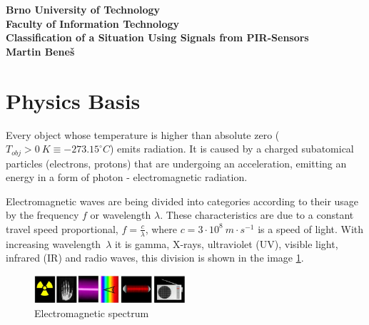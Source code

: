 \documentclass[10pt,a4paper]{article}
\begin{document}

  \begin{titlepage}

  \begin{center}
  \textsf{\LARGE \bfseries Brno University of Technology}\\[0.5cm]
  \textsf{\large \bfseries Faculty of Information Technology}\\[9cm]
  
  \textsf{ \Large \bfseries Classification of a Situation Using Signals from PIR-Sensors}\\[0.3cm]
  \textsf{ \bfseries Martin Beneš}\\[1cm]
  \end{center}
  \end{titlepage}
  \newpage

  \tableofcontents
  \newpage

  \section{Physics Basis}
  Every object whose temperature is higher than absolute zero ($T_{obj}>0~K\equiv -273.15^{\circ}C$)
  emits radiation. It is caused by a charged subatomical particles (electrons, protons) that are
  undergoing an acceleration, emitting an energy in a form of photon - electromagnetic radiation.
  
  Electromagnetic waves are being divided into categories according to their usage by the frequency $f$
  or wavelength $\lambda$. These characteristics are due to a constant travel speed proportional,
  $f=\frac{c}{\lambda}$, where $c=3\cdot10^{8}~m\cdot s^{-1}$ is a speed of light. With increasing
  wavelength~$\lambda$ it is gamma, X-rays, ultraviolet (UV), visible light, infrared (IR) and
  radio waves, this division is shown in the image \ref{fig:spectrum}.

  \begin{figure}[h!]
    \begin{center}
      \includegraphics[width=0.5\textwidth]{spectrum.png}
      \caption[title=Obrazek]{Electromagnetic spectrum\label{fig:spectrum} \cite{IZGcolors}}
    \end{center}    
  \end{figure}
\end{document}
